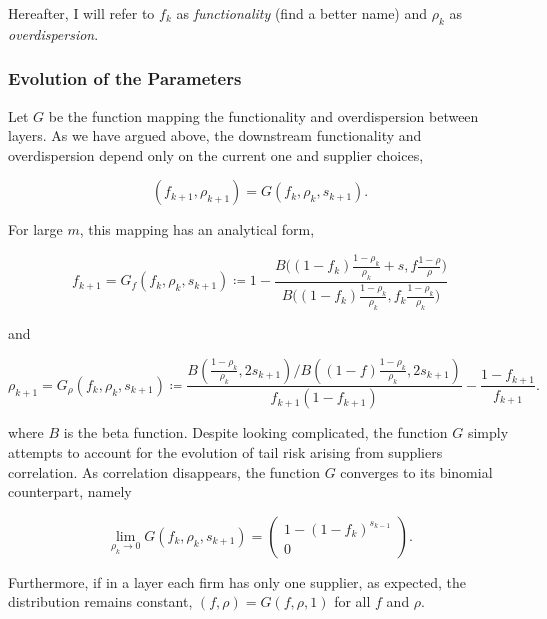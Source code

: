 \documentclass[american, abstract=on]{scrartcl}
\theoremstyle{plain}
\begin{document}
Hereafter, I will refer to $f_k$ as \textit{functionality} {\color{red} (find a better name)} and $\rho_k$ as \textit{overdispersion}.

\subsubsection{Evolution of the Parameters}

Let $G$ be the function mapping the functionality and overdispersion between layers. As we have argued above, the downstream functionality and overdispersion depend only on the current one and supplier choices,

\begin{equation}
  (f_{k + 1}, \rho_{k + 1}) = G(f_k, \rho_k, s_{k + 1}).
\end{equation}

For large $m$, this mapping has an analytical form,

\begin{equation}
  f_{k + 1} = G_f(f_k, \rho_k, s_{k + 1}) \coloneqq 1 - \frac{B\Big( (1 - f_k) \frac{1 - \rho_k}{\rho_k} + s, f \frac{1 - \rho}{\rho} \Big)}{B\Big( (1 - f_k) \frac{1 - \rho_k}{\rho_k}, f_k \frac{1 - \rho_k}{\rho_k} \Big)}
\end{equation}

and

\begin{equation}
  \rho_{k + 1} = G_\rho(f_k, \rho_k, s_{k + 1}) \coloneqq \frac{ B\left(\frac{1 - \rho_k}{\rho_k}, 2s_{k + 1} \right) \Big/ B\left((1 - f) \frac{1 - \rho_k}{\rho_k}, 2s_{k + 1} \right)}{f_{k + 1} (1 - f_{k + 1})} - \frac{1 - f_{k + 1}}{f_{k + 1}}.
\end{equation}

where $B$ is the beta function. Despite looking complicated, the function $G$ simply attempts to account for the evolution of tail risk arising from suppliers correlation. As correlation disappears, the function $G$ converges to its binomial counterpart, namely

\begin{equation}
  \lim_{\rho_k \rightarrow 0} G(f_k, \rho_k, s_{k + 1}) = \begin{pmatrix}
    1 - (1 - f_k)^{s_{k - 1}} \\ 0
  \end{pmatrix}.
\end{equation}

Furthermore, if in a layer each firm has only one supplier, as expected, the distribution remains constant, $(f, \rho) = G(f, \rho, 1)$ for all $f$ and $\rho$.

\newpage
\nocite{*}
\printbibliography
\end{document}
